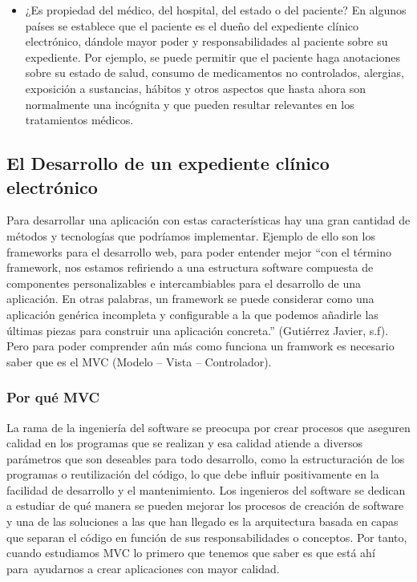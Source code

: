 \begin{itemize}
  \item ¿Es propiedad del médico, del hospital, del estado o del paciente? En algunos países se establece que el paciente es el dueño del expediente clínico electrónico, dándole mayor poder y responsabilidades al paciente sobre su expediente. Por ejemplo, se puede permitir que el paciente haga anotaciones sobre su estado de salud, consumo de medicamentos no controlados, alergias, exposición a sustancias, hábitos y otros aspectos que hasta ahora son normalmente una incógnita y que pueden resultar relevantes en los tratamientos médicos. \cite{marco2}

\end{itemize}

\subsection{El Desarrollo de un expediente clínico electrónico}

 Para desarrollar una aplicación con estas características hay una gran cantidad de métodos y tecnologías que podríamos implementar. Ejemplo de ello son los frameworks para el desarrollo web, para poder entender mejor “con el término framework, nos estamos refiriendo a una estructura software compuesta de componentes personalizables e intercambiables para el desarrollo de una aplicación. En otras palabras, un framework se puede considerar como una aplicación genérica incompleta y configurable a la que podemos añadirle las últimas piezas para construir una aplicación concreta.” (Gutiérrez Javier, s.f).
Pero para poder comprender aún más como funciona un framwork es necesario saber que es el MVC (Modelo – Vista – Controlador).
\subsubsection{Por qué MVC}

La rama de la ingeniería del software se preocupa por crear procesos que aseguren calidad en los programas que se realizan y esa calidad atiende a diversos parámetros que son deseables para todo desarrollo, como la estructuración de los programas o reutilización del código, lo que debe influir positivamente en la facilidad de desarrollo y el mantenimiento.
Los ingenieros del software se dedican a estudiar de qué manera se pueden mejorar los procesos de creación de software y una de las soluciones a las que han llegado es la arquitectura basada en capas que separan el código en función de sus responsabilidades o conceptos. Por tanto, cuando estudiamos MVC lo primero que tenemos que saber es que está ahí para ayudarnos a crear aplicaciones con mayor calidad. \cite{marco3}

